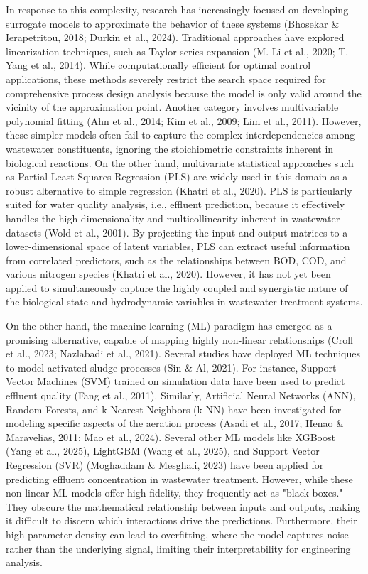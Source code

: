 \documentclass{article}
\begin{document}
In response to this complexity, research has increasingly focused on developing surrogate models to approximate the behavior of these systems (Bhosekar \& Ierapetritou, 2018; Durkin et al., 2024). Traditional approaches have explored linearization techniques, such as Taylor series expansion (M. Li et al., 2020; T. Yang et al., 2014). While computationally efficient for optimal control applications, these methods severely restrict the search space required for comprehensive process design analysis because the model is only valid around the vicinity of the approximation point. Another category involves multivariable polynomial fitting (Ahn et al., 2014; Kim et al., 2009; Lim et al., 2011). However, these simpler models often fail to capture the complex interdependencies among wastewater constituents, ignoring the stoichiometric constraints inherent in biological reactions. On the other hand, multivariate statistical approaches such as Partial Least Squares Regression (PLS) are widely used in this domain as a robust alternative to simple regression (Khatri et al., 2020). PLS is particularly suited for water quality analysis, i.e., effluent prediction, because it effectively handles the high dimensionality and multicollinearity inherent in wastewater datasets (Wold et al., 2001). By projecting the input and output matrices to a lower-dimensional space of latent variables, PLS can extract useful information from correlated predictors, such as the relationships between BOD, COD, and various nitrogen species (Khatri et al., 2020). However, it has not yet been applied to simultaneously capture the highly coupled and synergistic nature of the biological state and hydrodynamic variables in wastewater treatment systems.

On the other hand, the machine learning (ML) paradigm has emerged as a promising alternative, capable of mapping highly non-linear relationships (Croll et al., 2023; Nazlabadi et al., 2021). Several studies have deployed ML techniques to model activated sludge processes (Sin \& Al, 2021). For instance, Support Vector Machines (SVM) trained on simulation data have been used to predict effluent quality (Fang et al., 2011). Similarly, Artificial Neural Networks (ANN), Random Forests, and k-Nearest Neighbors (k-NN) have been investigated for modeling specific aspects of the aeration process (Asadi et al., 2017; Henao \& Maravelias, 2011; Mao et al., 2024). Several other ML models like XGBoost (Yang et al., 2025), LightGBM (Wang et al., 2025), and Support Vector Regression (SVR) (Moghaddam \& Mesghali, 2023) have been applied for predicting effluent concentration in wastewater treatment. However, while these non-linear ML models offer high fidelity, they frequently act as "black boxes." They obscure the mathematical relationship between inputs and outputs, making it difficult to discern which interactions drive the predictions. Furthermore, their high parameter density can lead to overfitting, where the model captures noise rather than the underlying signal, limiting their interpretability for engineering analysis.
\end{document}
